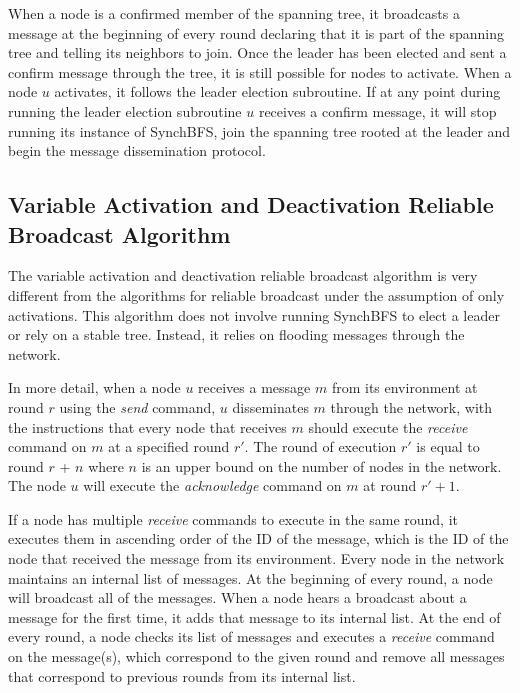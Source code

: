 \documentclass[english]{article}
\begin{document}
When a node is a confirmed member of the spanning tree, it broadcasts a message at the beginning of every round declaring that it is part of the spanning tree and telling its neighbors to join. Once the leader has been elected and sent a confirm message through the tree, it is still possible for nodes to activate. When a node $u$ activates, it follows the leader election subroutine. If at any point during running the leader election subroutine $u$ receives a confirm message, it will stop running its instance of SynchBFS, join the spanning tree rooted at the leader and begin the message dissemination protocol.


  \subsection {Variable Activation and Deactivation Reliable Broadcast Algorithm}

The variable activation and deactivation reliable broadcast algorithm is very different from the algorithms for reliable broadcast under the assumption of only activations. This algorithm does not involve running SynchBFS to elect a leader or rely on a stable tree. Instead, it relies on flooding messages through the network.

In more detail, when a node $u$ receives a message $m$ from its environment at round $r$ using the \textit{send} command, $u$ disseminates $m$ through the network, with the instructions that every node that receives $m$ should execute the \textit{receive} command on $m$ at a specified round $r'$. The round of execution $r'$ is equal to round $r$ + $n$ where $n$ is an upper bound on the number of nodes in the network. The node $u$ will execute the \textit{acknowledge} command on $m$ at round $r' + 1$.

If a node has multiple \textit{receive} commands to execute in the same round, it executes them in ascending order of the ID of the message, which is the ID of the node that received the message from its environment. Every node in the network maintains an internal list of messages. At the beginning of every round, a node will broadcast all of the messages. When a node hears a broadcast about a message for the first time, it adds that message to its internal list. At the end of every round, a node checks its list of messages and executes a \textit{receive} command on the message(s), which correspond to the given round and remove all messages that correspond to previous rounds from its internal list.  
\end{document}
